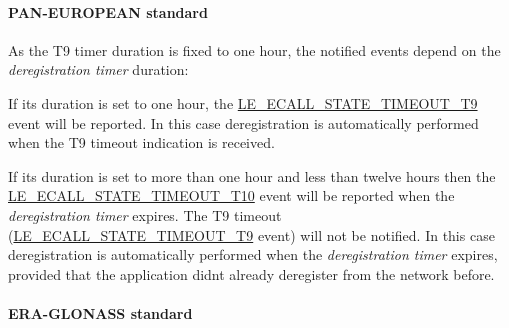  \hypertarget{c_SDD_eCall_le_ecall_configuration_nad_panEU}{}\paragraph{P\+A\+N-\/\+E\+U\+R\+O\+P\+E\+A\+N standard}\label{c_SDD_eCall_le_ecall_configuration_nad_panEU}
As the T9 timer duration is fixed to one hour, the notified events depend on the {\itshape deregistration timer} duration\+:
\begin{DoxyItemize}
\item If its duration is set to one hour, the \hyperlink{le__ecall__interface_8h_a233609e4724e549a1405f9177c0a07dda445e9365be6aac0b3403568d423ce6c5}{L\+E\+\_\+\+E\+C\+A\+L\+L\+\_\+\+S\+T\+A\+T\+E\+\_\+\+T\+I\+M\+E\+O\+U\+T\+\_\+\+T9} event will be reported. In this case deregistration is automatically performed when the T9 timeout indication is received.
\item If its duration is set to more than one hour and less than twelve hours then the \hyperlink{le__ecall__interface_8h_a233609e4724e549a1405f9177c0a07ddadafcb8d0490beb3d2778fadcbaeb8c11}{L\+E\+\_\+\+E\+C\+A\+L\+L\+\_\+\+S\+T\+A\+T\+E\+\_\+\+T\+I\+M\+E\+O\+U\+T\+\_\+\+T10} event will be reported when the {\itshape deregistration timer} expires. The T9 timeout (\hyperlink{le__ecall__interface_8h_a233609e4724e549a1405f9177c0a07dda445e9365be6aac0b3403568d423ce6c5}{L\+E\+\_\+\+E\+C\+A\+L\+L\+\_\+\+S\+T\+A\+T\+E\+\_\+\+T\+I\+M\+E\+O\+U\+T\+\_\+\+T9} event) will not be notified. In this case deregistration is automatically performed when the {\itshape deregistration timer} expires, provided that the application didn\textquotesingle{}t already deregister from the network before.
\end{DoxyItemize}\hypertarget{c_SDD_eCall_le_ecall_configuration_nad_eraGlonass}{}\paragraph{E\+R\+A-\/\+G\+L\+O\+N\+A\+S\+S standard}\label{c_SDD_eCall_le_ecall_configuration_nad_eraGlonass}


